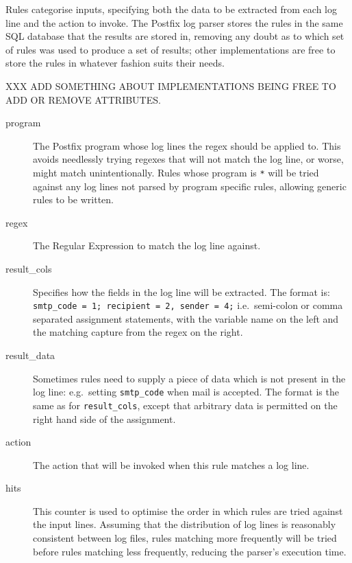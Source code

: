 \documentclass[draft]{svmult}
\newcommand{\tab}[0]{%
    \hspace*{2em}%
}
\begin{document}
\label{Rules}

Rules categorise inputs, specifying both the data to be extracted from each
log line and the action to invoke.  The Postfix log parser stores the rules
in the same SQL database that the results are stored in, removing any doubt
as to which set of rules was used to produce a set of results; other
implementations are free to store the rules in whatever fashion suits their
needs.  

XXX ADD SOMETHING ABOUT IMPLEMENTATIONS BEING FREE TO ADD OR REMOVE
ATTRIBUTES\@.

\begin{description}

    \item [program] The Postfix program whose log lines the regex should be
        applied to.  This avoids needlessly trying regexes that will not
        match the log line, or worse, might match unintentionally.  Rules
        whose program is \texttt{*} will be tried against any log lines not
        parsed by program specific rules, allowing generic rules to be
        written.

    \item [regex] The Regular Expression to match the log line against.

    \item [result\_cols] Specifies how the fields in the log line will be
        extracted.  The format is:
        \tab{} \texttt{smtp\_code = 1; recipient = 2, sender = 4;} \newline
        i.e.\ semi-colon or comma separated assignment statements, with the
        variable name on the left and the matching capture from the regex
        on the right.

    \item [result\_data] Sometimes rules need to supply a piece of data
        which is not present in the log line: e.g.\ setting
        \texttt{smtp\_code} when mail is accepted.  The format is the same
        as for \texttt{result\_cols}, except that arbitrary data is
        permitted on the right hand side of the assignment.

    \item [action] The action that will be invoked when this rule matches a
        log line.

    \item [hits] This counter is used to optimise the order in which rules
        are tried against the input lines.  Assuming that the distribution
        of log lines is reasonably consistent between log files, rules
        matching more frequently will be tried before rules matching less
        frequently, reducing the parser's execution time.


\end{description}
\end{document}
